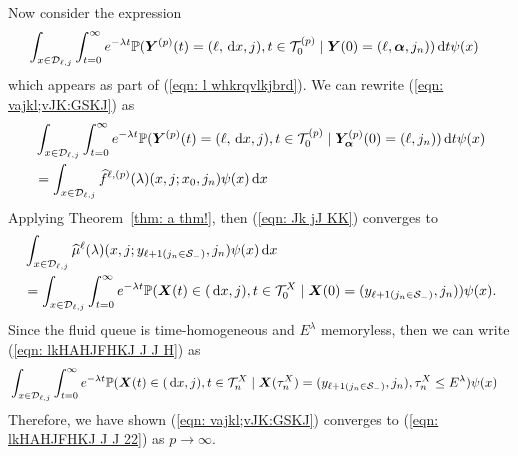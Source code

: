 Now consider the expression 
\begin{align}
	&\int_{x\in\mathcal{D}_{\ell,j}} \int_{t=0}^\infty e^{-\lambda t} \mathbb P({\boldsymbol Y}^{(p)}(t) = (\ell,\, \mathrm{d} x, j),  
	t\in\mathcal T_0^{(p)} \mid \boldsymbol Y(0) = (\ell,\boldsymbol\alpha, j_n)
	 	 )\, \mathrm{d} t  \psi(x)  \label{eqn: vajkl;vJK:GSKJ}
\end{align}
which appears as part of (\ref{eqn: l whkrqvlkjbrd}). We can rewrite (\ref{eqn: vajkl;vJK:GSKJ}) as  
\begin{align}
	 &\int_{x\in\mathcal{D}_{\ell,j}} \int_{t=0}^\infty e^{-\lambda t} \mathbb P({\boldsymbol Y}^{(p)}(t) = (\ell,\, \mathrm{d} x,j), 
	t\in\mathcal T_0^{(p)}\mid \bm{Y}_{\bm{\alpha}}^{(p)}(0) = (\ell,j_n))\, \mathrm{d} t \psi(x) \nonumber 
	 \\&= \int_{x\in\mathcal{D}_{\ell,j}} \widehat f^{\ell,(p)} (\lambda)(x,j;x_0,j_n) \psi(x)\, \mathrm{d} x \label{eqn: Jk jJ KK}
\end{align}
Applying Theorem~\ref{thm: a thm!}, then (\ref{eqn: Jk jJ KK}) converges to 
\begin{align}
	&\int_{x\in\mathcal{D}_{\ell,j}} \widehat \mu^{\ell} (\lambda)(x,j;y_{\ell+1(j_n\in\mathcal S_-)},j_n) \psi(x)\, \mathrm{d} x \nonumber 
	\\&= \int_{x\in\mathcal{D}_{\ell,j}} \int_{t=0}^\infty e^{-\lambda t}\mathbb P(\boldsymbol X(t)\in(\, \mathrm{d} x, j), t\in\mathcal T_0^X \mid \boldsymbol X(0) = (y_{\ell+1(j_n\in\mathcal S_-)}, j_n) ) \psi(x). \label{eqn: lkHAHJFHKJ J J H}
\end{align}
Since the fluid queue is time-homogeneous and \(E^\lambda\) memoryless, then we can write (\ref{eqn: lkHAHJFHKJ J J H}) as 
\begin{align}
	&\int_{x\in\mathcal{D}_{\ell,j}} \int_{t=0}^\infty e^{-\lambda t} \mathbb P(\boldsymbol X(t)\in(\, \mathrm{d} x,j), t\in\mathcal T_n^{X} \mid  
	\boldsymbol X(\tau_n^X) = (y_{\ell+1(j_n\in\mathcal S_-)},j_n), \tau_n^X\leq E^\lambda ) \psi(x)  \label{eqn: lkHAHJFHKJ J J 22}
\end{align}
Therefore, we have shown (\ref{eqn: vajkl;vJK:GSKJ}) converges to (\ref{eqn: lkHAHJFHKJ J J 22}) as \(p\to\infty\). 

